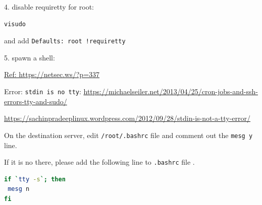 \documentclass[
	fontsize=10pt
	paper=a4
]{scrartcl}
\begin{document}
4. disable requiretty for root:
\begin{lstlisting}[language=bash]
visudo
\end{lstlisting}
and add \texttt{Defaults: root !requiretty}

5. spawn a shell:

\url{Ref: https://netsec.ws/?p=337}


Error: \texttt{stdin is no tty}:
\url{https://michaelseiler.net/2013/04/25/cron-jobs-and-ssh-errors-tty-and-sudo/}

\url{https://sachinpradeeplinux.wordpress.com/2012/09/28/stdin-is-not-a-tty-error/}

On the destination server, edit \texttt{/root/.bashrc} file and comment out
the \texttt{mesg y} line.

If it is no there, please add the following line to \texttt{.bashrc} file .

\begin{lstlisting}[language=bash]
if `tty -s`; then
 mesg n
fi
\end{lstlisting}









\end{document}
